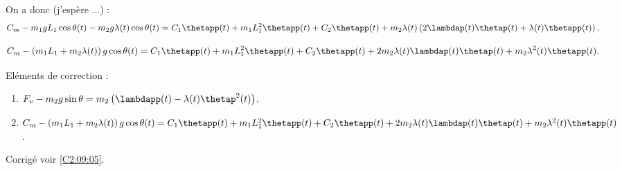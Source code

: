On a donc (j'espère ...) :
$$ C_m -m_1 gL_1\cos\theta(t)-m_2 g\lambda(t)\cos\theta(t) =
C_1 \thetapp(t) + m_1 L_1^2 \thetapp(t)
+C_2 \thetapp(t) + m_2 \lambda(t)  \left(  2\lambdap(t) \thetap(t)  + \lambda(t) \thetapp(t)\right).
$$

$$ C_m - \left(m_1 L_1+m_2 \lambda(t)\right) g \cos\theta(t) =
C_1 \thetapp(t) + m_1 L_1^2 \thetapp(t)
+C_2 \thetapp(t) +    2m_2 \lambda(t)\lambdap(t) \thetap(t)  + m_2 \lambda^2(t) \thetapp(t).
$$

\else
\fi


\ifprof
\else
\footnotesize
Eléments de correction : 
\begin{enumerate}
 \item $ F_v-m_2 g\sin \theta = m_2 \left(\lambdapp(t)   - \lambda(t) \thetap^2(t) \right)$.
\item  $C_m - \left(m_1 L_1+m_2 \lambda(t)\right) g \cos\theta(t) =
C_1 \thetapp(t) + m_1 L_1^2 \thetapp(t)
+C_2 \thetapp(t) +    2m_2 \lambda(t)\lambdap(t) \thetap(t)  + m_2 \lambda^2(t) \thetapp(t)
$.
\end{enumerate}
\normalsize

\begin{flushright}
\footnotesize{Corrigé  voir \ref{C2:09:05}.}
\end{flushright}%
\fi